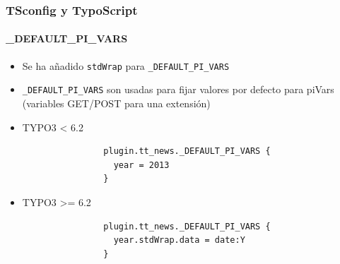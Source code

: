 
\begin{frame}[fragile]
	\frametitle{TSconfig y TypoScript}
	\framesubtitle{\_DEFAULT\_PI\_VARS}

	\begin{itemize}
		\item Se ha añadido \texttt{stdWrap} para \texttt{\_DEFAULT\_PI\_VARS}
		\item \texttt{\_DEFAULT\_PI\_VARS} son usadas para fijar valores por defecto para piVars (variables GET/POST para una extensión)

		\item TYPO3 < 6.2
			\begin{lstlisting}
				plugin.tt_news._DEFAULT_PI_VARS {
				  year = 2013
				}
			\end{lstlisting}

		\item TYPO3 >= 6.2
			\begin{lstlisting}
				plugin.tt_news._DEFAULT_PI_VARS {
				  year.stdWrap.data = date:Y
				}
			\end{lstlisting}

	\end{itemize}

\end{frame}


